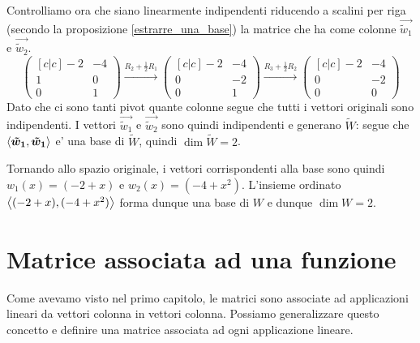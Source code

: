 \begin{solution}
\begin{enumerate}
        Controlliamo ora che siano linearmente indipendenti riducendo a scalini per riga (secondo la proposizione \ref{estrarre_una_base}) la matrice che ha come colonne $\vec{\tilde{w}_1}$ e $\vec{\tilde{w}_2}$.
        \begin{equation*}
            \begin{pmatrix}[c|c]
                -2 & -4 \\ 1 & 0 \\ 0 & 1
            \end{pmatrix} \xrightarrow[]{R_2 + \frac12R_1}
            \begin{pmatrix}[c|c]
                -2 & -4 \\ 0 & -2 \\ 0 & 1
            \end{pmatrix} \xrightarrow[]{R_3 + \frac12R_2}
            \begin{pmatrix}[c|c]
                -2 & -4 \\ 0 & -2 \\ 0 & 0
            \end{pmatrix}
        \end{equation*}
        Dato che ci sono tanti pivot quante colonne segue che tutti i vettori originali sono indipendenti.
        I vettori $\vec{\tilde{w}_1}$ e $\vec{\tilde{w}_2}$ sono quindi indipendenti e generano $\widetilde{W}$: segue che $\left\langle \bm{\tilde{w}_1}, \bm{\tilde{w}_1} \right\rangle$ e' una base di $\widetilde{W}$, quindi $\dim \widetilde{W} = 2$.

        Tornando allo spazio originale, i vettori corrispondenti alla base sono quindi $w_1(x) = (-2 + x)$ e $w_2(x) = (-4 + x^2)$. L'insieme ordinato $\left\langle (-2+x), (-4+x^2) \right\rangle$ forma dunque una base di $W$ e dunque $\dim W = 2$.
    \end{enumerate}
\end{solution}

\section{Matrice associata ad una funzione}

Come avevamo visto nel primo capitolo, le matrici sono associate ad applicazioni lineari da vettori colonna in vettori colonna. Possiamo generalizzare questo concetto e definire una matrice associata ad ogni applicazione lineare.


